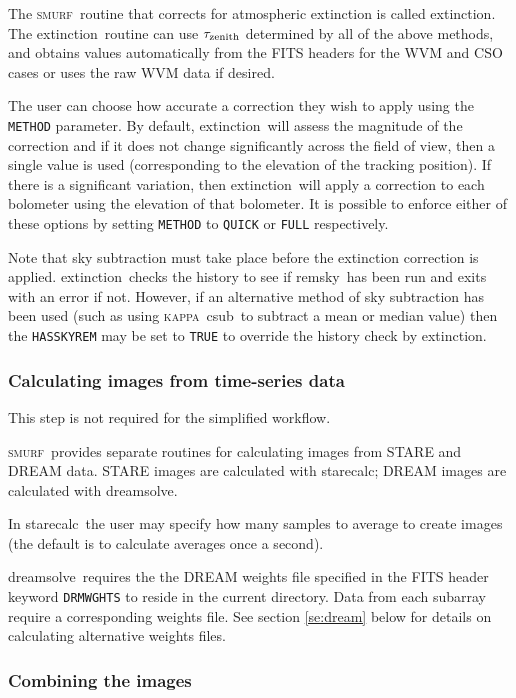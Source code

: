 \documentclass[twoside,11pt]{article}
\newcommand{\xref}[3]{#1}
\newcommand{\xlabel}[1]{}
\renewcommand{\_}{\texttt{\symbol{95}}}
\newcommand{\KAPPA}{\textsc{kappa}}
\newcommand{\SMURF}{\textsc{smurf}}
\newcommand{\task}[1]{\textsf{#1}}
\newcommand{\dreamsolve}{\xref{\task{dreamsolve}}{sun258}{DREAMSOLVE}}
\newcommand{\starecalc}{\xref{\task{starecalc}}{sun258}{STARECALC}}
\newcommand{\extinction}{\xref{\task{extinction}}{sun258}{EXTINCTION}}
\newcommand{\remsky}{\xref{\task{remsky}}{sun258}{REMSKY}}
\newcommand{\csub}{\xref{\task{csub}}{sun95}{CSUB}}
\begin{document}
The \SMURF\ routine that corrects for atmospheric extinction is called
\extinction. The \extinction\ routine can use $\tau_{\rm zenith}$
determined by all of the above methods, and obtains values
automatically from the FITS headers for the WVM and CSO cases or uses
the raw WVM data if desired.

The user can choose how accurate a correction they wish to apply using
the \texttt{METHOD} parameter. By default, \extinction\ will assess
the magnitude of the correction and if it does not change
significantly across the field of view, then a single value is used
(corresponding to the elevation of the tracking position). If there is
a significant variation, then \extinction\ will apply a correction to
each bolometer using the elevation of that bolometer. It is possible
to enforce either of these options by setting \texttt{METHOD} to
\texttt{QUICK} or \texttt{FULL} respectively.

Note that sky subtraction must take place before the extinction
correction is applied. \extinction\ checks the history to see if
\remsky\ has been run and exits with an error if not. However, if an
alternative method of sky subtraction has been used (such as using
\KAPPA\ \csub\ to subtract a mean or median value) then the
\texttt{HASSKYREM} may be set to \texttt{TRUE} to override the history
check by \extinction.

\subsubsection{\xlabel{dsimages}Calculating images from time-series data\label{se:dsimages}}

This step is not required for the simplified workflow.

\SMURF\ provides separate routines for calculating images from STARE
and DREAM data. STARE images are calculated with \starecalc; DREAM
images are calculated with \dreamsolve. 

In \starecalc\ the user may specify how many samples to average to
create images (the default is to calculate averages once a second).

\dreamsolve\ requires the the DREAM weights file specified in the FITS
header keyword \texttt{DRMWGHTS} to reside in the current
directory. Data from each subarray require a corresponding weights
file. See section \ref{se:dream} below for details on calculating
alternative weights files.

\subsubsection{\xlabel{mosaic}Combining the images\label{se:mosaic}}
\end{document}
